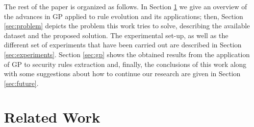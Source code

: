 \documentclass[a4paper,10pt,twocolumn,preprint,3p]{elsarticle}
\begin{document}
The rest of the paper is organized as follows. In Section \ref{sec:SotA} we give an overview of the advances in GP applied to rule evolution and its applications; then, Section \ref{sec:problem} depicts the problem this work tries to solve, describing the available dataset and the proposed solution. The experimental set-up, as well as the different set of experiments that have been carried out are described in Section \ref{sec:experiments}. Section \ref{sec:gp} shows the obtained results from the application of GP to security rules extraction and, finally, the conclusions of this work along with some suggestions about how to continue our research are given in Section \ref{sec:future}. 

\section{Related Work}
\label{sec:SotA}

\end{document}
